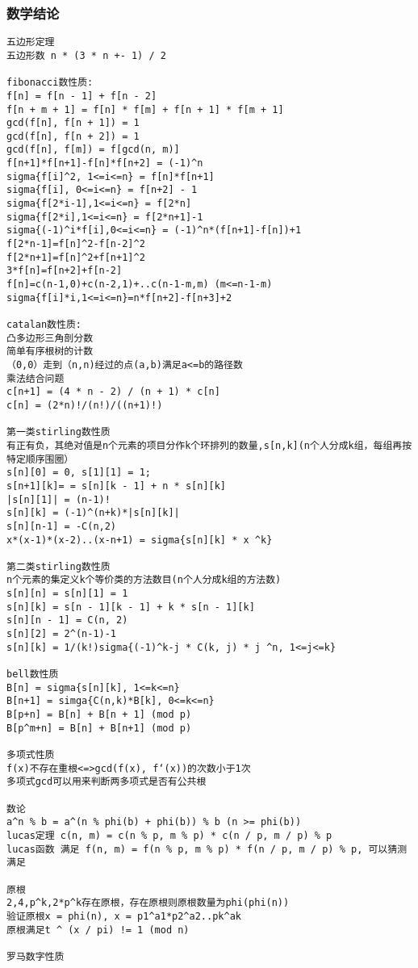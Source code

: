 \subsubsection{数学结论}
\begin{verbatim}
五边形定理
五边形数 n * (3 * n +- 1) / 2

fibonacci数性质:
f[n] = f[n - 1] + f[n - 2]
f[n + m + 1] = f[n] * f[m] + f[n + 1] * f[m + 1]
gcd(f[n], f[n + 1]) = 1
gcd(f[n], f[n + 2]) = 1
gcd(f[n], f[m]) = f[gcd(n, m)]
f[n+1]*f[n+1]-f[n]*f[n+2] = (-1)^n
sigma{f[i]^2, 1<=i<=n} = f[n]*f[n+1]
sigma{f[i], 0<=i<=n} = f[n+2] - 1
sigma{f[2*i-1],1<=i<=n} = f[2*n]
sigma{f[2*i],1<=i<=n} = f[2*n+1]-1
sigma{(-1)^i*f[i],0<=i<=n} = (-1)^n*(f[n+1]-f[n])+1
f[2*n-1]=f[n]^2-f[n-2]^2
f[2*n+1]=f[n]^2+f[n+1]^2
3*f[n]=f[n+2]+f[n-2]
f[n]=c(n-1,0)+c(n-2,1)+..c(n-1-m,m) (m<=n-1-m)
sigma{f[i]*i,1<=i<=n}=n*f[n+2]-f[n+3]+2

catalan数性质:
凸多边形三角剖分数
简单有序根树的计数
（0,0）走到（n,n)经过的点(a,b)满足a<=b的路径数
乘法结合问题
c[n+1] = (4 * n - 2) / (n + 1) * c[n]
c[n] = (2*n)!/(n!)/((n+1)!)

第一类stirling数性质
有正有负，其绝对值是n个元素的项目分作k个环排列的数量,s[n,k](n个人分成k组，每组再按特定顺序围圈）
s[n][0] = 0, s[1][1] = 1;
s[n+1][k]= = s[n][k - 1] + n * s[n][k]
|s[n][1]| = (n-1)!
s[n][k] = (-1)^(n+k)*|s[n][k]|
s[n][n-1] = -C(n,2)
x*(x-1)*(x-2)..(x-n+1) = sigma{s[n][k] * x ^k}

第二类stirling数性质
n个元素的集定义k个等价类的方法数目(n个人分成k组的方法数)
s[n][n] = s[n][1] = 1
s[n][k] = s[n - 1][k - 1] + k * s[n - 1][k]
s[n][n - 1] = C(n, 2)
s[n][2] = 2^(n-1)-1
s[n][k] = 1/(k!)sigma{(-1)^k-j * C(k, j) * j ^n, 1<=j<=k}

bell数性质
B[n] = sigma{s[n][k], 1<=k<=n}
B[n+1] = simga{C(n,k)*B[k], 0<=k<=n}
B[p+n] = B[n] + B[n + 1] (mod p)
B[p^m+n] = B[n] + B[n+1] (mod p)

多项式性质
f(x)不存在重根<=>gcd(f(x), f‘(x))的次数小于1次
多项式gcd可以用来判断两多项式是否有公共根

数论
a^n % b = a^(n % phi(b) + phi(b)) % b (n >= phi(b))
lucas定理 c(n, m) = c(n % p, m % p) * c(n / p, m / p) % p
lucas函数 满足 f(n, m) = f(n % p, m % p) * f(n / p, m / p) % p, 可以猜测满足

原根
2,4,p^k,2*p^k存在原根，存在原根则原根数量为phi(phi(n))
验证原根x = phi(n), x = p1^a1*p2^a2..pk^ak
原根满足t ^ (x / pi) != 1 (mod n)

罗马数字性质
\end{verbatim}
